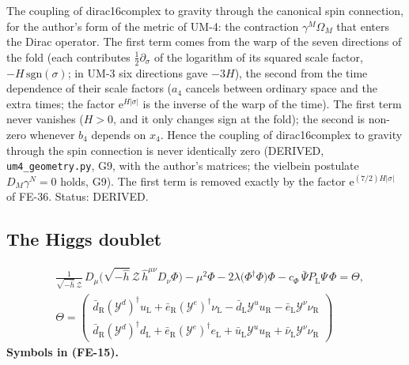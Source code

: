 \documentclass[
  10pt,
]{article}
\begin{document}
The coupling of dirac16complex to gravity through the canonical spin
connection, for the author's form of the metric of UM-4: the contraction
\(\gamma^M\Omega_M\) that enters the Dirac operator. The first term
comes from the warp of the seven directions of the fold (each
contributes \(\frac12\partial_\sigma\) of the logarithm of its squared
scale factor, \(-H\,\mathrm{sgn}(\sigma)\); in UM-3 six directions gave
\(-3H\)), the second from the time dependence of their scale factors
(\(a_4\) cancels between ordinary space and the extra times; the factor
\(\mathrm{e}^{H\lvert\sigma\rvert}\) is the inverse of the warp of the
time). The first term never vanishes (\(H > 0\), and it only changes
sign at the fold); the second is non-zero whenever \(b_4\) depends on
\(x_4\). Hence the coupling of dirac16complex to gravity through the
spin connection is never identically zero (DERIVED,
\texttt{um4\_geometry.py}, G9, with the author's matrices; the vielbein
postulate \(D_M\gamma^N = 0\) holds, G9). The first term is removed
exactly by the factor \(\mathrm{e}^{(7/2)H\lvert\sigma\rvert}\) of
FE-36. Status: DERIVED.

\hypertarget{the-higgs-doublet}{%
\subsection{The Higgs doublet}\label{the-higgs-doublet}}

\[
\begin{aligned}
&\frac{1}{\sqrt{-\hat h}\,\mathcal{Z}}\,D_\mu\big(\sqrt{-\hat h}\,\mathcal{Z}\,\hat h^{\mu\nu}D_\nu\Phi\big) - \mu^2\Phi
 - 2\lambda\big(\Phi^\dagger\Phi\big)\Phi - c_\Phi\,\bar\Psi P_{\mathrm{L}}\Psi\,\Phi = \Theta,\\
&\Theta = \begin{pmatrix}\bar d_{\mathrm{R}}(\mathcal{Y}^{d})^\dagger u_{\mathrm{L}} + \bar e_{\mathrm{R}}(\mathcal{Y}^{e})^\dagger\nu_{\mathrm{L}}
 - \bar d_{\mathrm{L}}\mathcal{Y}^{u}u_{\mathrm{R}} - \bar e_{\mathrm{L}}\mathcal{Y}^{\nu}\nu_{\mathrm{R}}\\
 \bar d_{\mathrm{R}}(\mathcal{Y}^{d})^\dagger d_{\mathrm{L}} + \bar e_{\mathrm{R}}(\mathcal{Y}^{e})^\dagger e_{\mathrm{L}}
 + \bar u_{\mathrm{L}}\mathcal{Y}^{u}u_{\mathrm{R}} + \bar\nu_{\mathrm{L}}\mathcal{Y}^{\nu}\nu_{\mathrm{R}}\end{pmatrix}
\end{aligned} \tag{FE-15}
\] \textbf{Symbols in (FE-15).}
\end{document}
